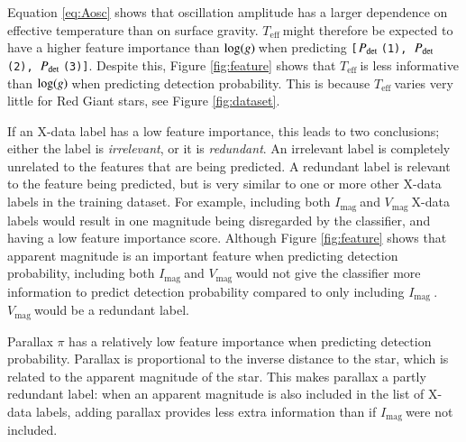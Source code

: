 \documentclass[a4paper,fleqn,usenatbib,useAMS]{mnras}
\newcommand{\numax}{\ensuremath{\nu_{\textrm{max}}}}
\newcommand{\teff}{\ensuremath{T_{\textrm{eff}}\:}}
\newcommand{\pdet}{\ensuremath{P_{\rm det}\:}}
\newcommand{\imag}{\ensuremath{I_{\textrm{mag}}\:}}
\newcommand{\vmag}{\ensuremath{V_{\textrm{mag}}\:}}
\newcommand{\logg}{\ensuremath{{\rm log}(g)\:}}
\begin{document}

Equation \ref{eq:Aosc} shows that oscillation amplitude has a larger dependence on effective temperature than on surface gravity. \teff might therefore be expected to have a higher feature importance than \logg when predicting \texttt{[\pdet(1), \pdet(2), \pdet(3)]}. Despite this, Figure \ref{fig:feature} shows that \teff is less informative than \logg when predicting detection probability. This is because \teff varies very little for Red Giant stars, see Figure \ref{fig:dataset}.

If an X-data label has a low feature importance, this leads to two conclusions; either the label is {\it irrelevant}, or it is {\it redundant}. An irrelevant label is completely unrelated to the features that are being predicted. A redundant label is relevant to the feature being predicted, but is very similar to one or more other X-data labels in the training dataset. For example, including both \imag and \vmag X-data labels would result in one magnitude being disregarded by the classifier, and having a low feature importance score. Although Figure \ref{fig:feature} shows that apparent magnitude is an important feature when predicting detection probability, including both \imag and \vmag would not give the classifier more information to predict detection probability compared to only including \imag. \vmag would be a redundant label. 

Parallax $\pi$ has a relatively low feature importance when predicting detection probability. Parallax is proportional to the inverse distance to the star, which is related to the apparent magnitude of the star. This makes parallax a partly redundant label: when an apparent magnitude is also included in the list of X-data labels, adding parallax provides less extra information than if \imag were not included.
\end{document}
